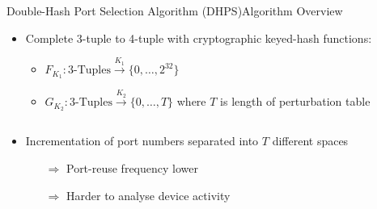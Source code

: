 \documentclass[aspectratio=169, hyperref={colorlinks=true, allcolors=SecondaryColor}, c]{beamer}
\begin{document}
	\begin{frame}[fragile]{Double-Hash Port Selection Algorithm (DHPS)}{Algorithm Overview}
		\begin{itemize}
			\item \alert{Complete 3-tuple to 4-tuple} with cryptographic keyed-hash functions:
			\begin{itemize}
				\scriptsize
				\item \( F_{K_1}: \text{3-Tuples} \xrightarrow{K_1} \{0, \ldots, 2^{32}\}\)
				\item \( G_{K_2}: \text{3-Tuples} \xrightarrow{K_2} \{0, \ldots, T\}\) where $T$ is length of \alert{perturbation table}
			\end{itemize}
		\end{itemize}
		\begin{columns}
			\begin{column}{0.5\textwidth}
				\begin{itemize}
					\item Incrementation of port numbers separated into \alert{$T$ different spaces}
					\begin{itemize}
						\item[\alert{$\Rightarrow$}] Port-reuse frequency lower %
						\item[\alert{$\Rightarrow$}] Harder to analyse device activity %
					\end{itemize}
				\end{itemize}
			\end{column}
			\begin{column}{0.5\textwidth}
				\begin{center}
					\begin{adjustbox}{max width=\textwidth}
					\end{adjustbox}
				\end{center}
			\end{column}
		\end{columns}
	\end{frame}
\end{document}
